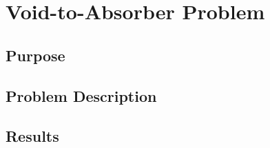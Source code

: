 \section{Void-to-Absorber Problem}

\subsection{Purpose}

\subsection{Problem Description}

\subsection{Results}
